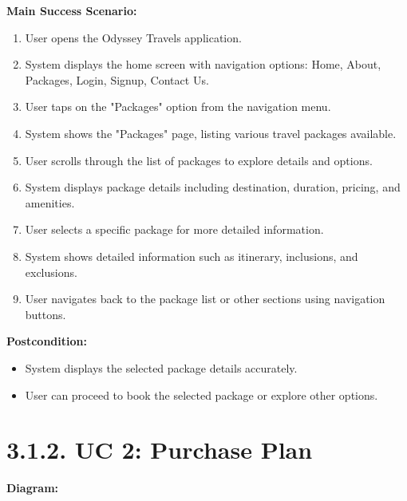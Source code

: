 \documentclass{scrreprt}
\begin{document}
\textbf{Main Success Scenario:}
\begin{enumerate}
    \item User opens the Odyssey Travels application.
    \item System displays the home screen with navigation options: Home, About, Packages, Login, Signup, Contact Us.
    \item User taps on the "Packages" option from the navigation menu.
    \item System shows the "Packages" page, listing various travel packages available.
    \item User scrolls through the list of packages to explore details and options.
    \item System displays package details including destination, duration, pricing, and amenities.
    \item User selects a specific package for more detailed information.
    \item System shows detailed information such as itinerary, inclusions, and exclusions.
    \item User navigates back to the package list or other sections using navigation buttons.
\end{enumerate}

\textbf{Postcondition:}
\begin{itemize}
    \item System displays the selected package details accurately.
    \item User can proceed to book the selected package or explore other options.
\end{itemize}

\section*{\textbf{3.1.2. UC 2: Purchase Plan}}
\textbf{Diagram:}
\newline
\newline
\begin{center}
    \parbox{0.8\textwidth}{ 
        \centering
    }
\end{center}
\end{document}

